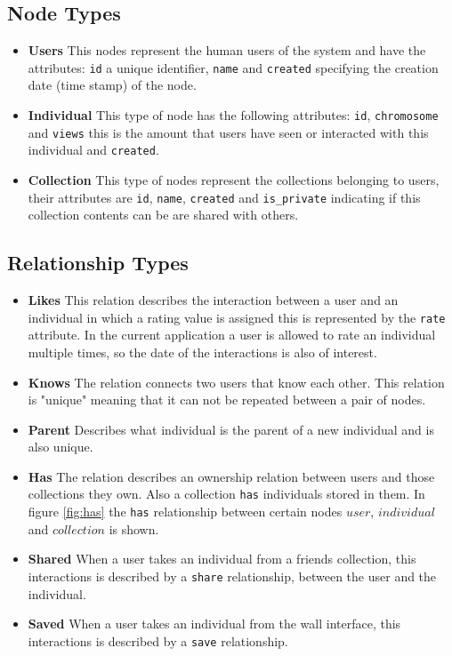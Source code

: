\documentclass[conference]{IEEEtran}
\begin{document}
\subsection{Node Types}
\begin{itemize}

\item {\bf Users} This nodes represent the human users of the system and have 
the attributes: {\tt id} a unique identifier, {\tt name}  and {\tt created}
specifying the  creation date (time stamp) of the node. 

\item {\bf Individual} This type of node has the following attributes: 
{\tt id}, {\tt chromosome}  and {\tt views} this is 
the amount that users have seen or interacted with this individual and
 {\tt created}.

\item {\bf Collection} This type of nodes represent the collections belonging
to users, their attributes are {\tt id}, 
{\tt name}, {\tt created} and {\tt is\_private} indicating if this collection
contents can be are shared with others. 
\end{itemize}

\subsection{Relationship Types}

\begin{itemize}
\item {\bf Likes} This relation describes the interaction between a user and
an individual in which a rating value is assigned this is represented by 
the {\tt rate} attribute. In the current application a user is allowed to rate
an individual multiple times, so the date of the interactions is also of
interest. 

\item {\bf Knows} The relation connects two users that know each
other. This relation is "unique" meaning that it can not be repeated between a pair of nodes. 

\item {\bf Parent} Describes what individual is the parent of a new individual and is also unique.

\item {\bf Has} The relation describes an ownership relation between users and
those collections they own. Also a collection {\tt has}  individuals stored
in them.  In figure \ref{fig:has} the {\tt has} relationship 
between certain nodes $user$, $individual$ and $collection$ is shown.

\item {\bf Shared} When a user takes an individual from a friends collection, this interactions 
is described by a {\tt share} relationship, between the user and the individual. 

\item {\bf Saved} When a user takes an individual from the wall interface, this 
interactions is described by a {\tt save} relationship. 
\end{itemize}
\end{document}

